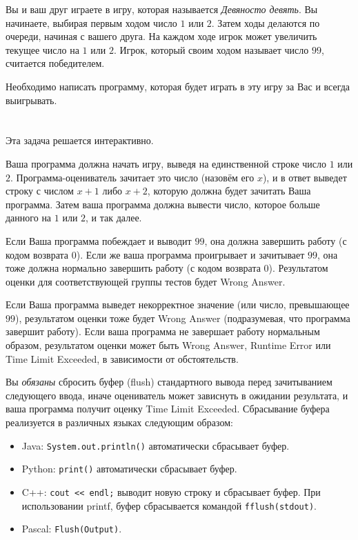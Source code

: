 \ifx\boi\undefined\fi
\def\version{jury-1}

Вы и ваш друг играете в игру, которая называется \emph{Девяносто девять}.
Вы начинаете, выбирая первым ходом число $1$ или $2$.
Затем ходы делаются по очереди, начиная с вашего друга. На каждом ходе игрок может увеличить текущее число на $1$ или $2$.
Игрок, который своим ходом называет число $99$, считается победителем.

Необходимо написать программу, которая будет играть в эту игру за Вас и всегда выигрывать.

\section*{\interactivity}
Эта задача решается интерактивно.

Ваша программа должна начать игру, выведя на единственной строке число $1$ или $2$.
Программа-оцениватель зачитает это число (назовём его $x$), и в ответ выведет строку с числом $x+1$ либо $x+2$, которую должна будет зачитать Ваша программа. Затем ваша программа должна вывести число, которое больше данного на $1$ или $2$, и так далее.

Если Ваша программа побеждает и выводит $99$, она должна завершить работу (с кодом возврата 0).
Если же ваша программа проигрывает и зачитывает $99$, она тоже должна нормально завершить работу (с кодом возврата 0). Результатом оценки для соответствующей группы тестов будет Wrong Answer.

Если Ваша программа выведет некорректное значение (или число, превышающее $99$), результатом оценки тоже будет Wrong Answer (подразумевая, что программа завершит работу).
Если ваша программа не завершает работу нормальным образом, результатом оценки может быть Wrong Answer, Runtime Error или Time Limit Exceeded, в зависимости от обстоятельств.

Вы \emph{обязаны} сбросить буфер (flush) стандартного вывода перед зачитыванием следующего ввода, иначе оцениватель может зависнуть в ожидании результата, и ваша программа получит оценку Time Limit Exceeded. Сбрасывание буфера реализуется в различных языках следующим образом:
\begin{itemize}
  \item Java: \texttt{System.out.println()} автоматически сбрасывает буфер.
  \item Python: \texttt{print()} автоматически сбрасывает буфер.
  \item C++: \texttt{cout << endl;} выводит новую строку и сбрасывает буфер. При использовании printf, буфер сбрасывается командой \texttt{fflush(stdout)}.
  \item Pascal: \texttt{Flush(Output)}.
\end{itemize}

